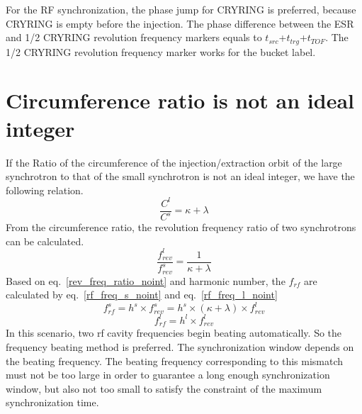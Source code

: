 For the RF synchronization, the phase jump for CRYRING is preferred, because CRYRING is empty before the injection. The phase difference between the ESR and 1/2 CRYRING revolution frequency markers equals to $t_{src}$+$t_{trg}$+$t_{TOF}$. The 1/2 CRYRING revolution frequency marker works for the bucket label.

\section{ Circumference ratio is not an ideal integer}
If the Ratio of the circumference of the injection/extraction orbit of the large synchrotron to that of the small synchrotron is not an ideal integer, we have the following relation.
\begin{equation}
\frac{C^l}{C^s}=\kappa + \lambda  \label{circumference_ratio_noint}
\end{equation}
From the circumference ratio, the revolution frequency ratio of two synchrotrons can be calculated.
\begin{equation}
\frac{f_{rev}^{l}}{f_{rev}^{s}}=\frac{1}{\kappa+ \lambda} \label{rev_freq_ratio_noint}
\end{equation}
Based on eq.~\ref{rev_freq_ratio_noint} and harmonic number, the $f_{rf}$ are calculated by eq.~\ref{rf_freq_s_noint} and eq.~\ref{rf_freq_l_noint}
\begin{equation} 
f_{rf}^{s}= h^s \times f_{rev}^{s}=h^s \times (\kappa+ \lambda) \times f_{rev}^{l} \label{rf_freq_s_noint}
\end{equation}
\begin{equation} 
f_{rf}^{l}= h^l \times f_{rev}^{l} \label{rf_freq_l_noint}
\end{equation}
In this scenario, two rf cavity frequencies begin beating automatically. So the frequency beating method is preferred. The synchronization window depends on the beating frequency. The beating frequency corresponding to this mismatch must not be too large in order to guarantee a long enough synchronization window, but also not too small to satisfy the constraint of the maximum synchronization time.
